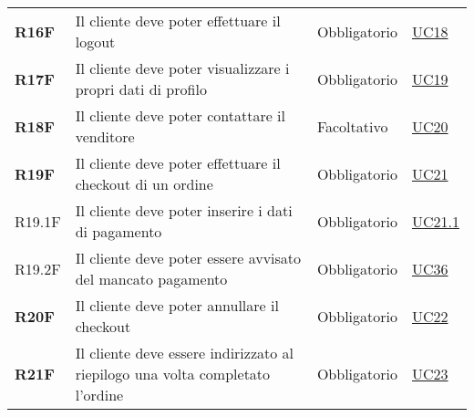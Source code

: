 \begin{center}
\begin{longtable}[!h]{p{50px} p{245px} p{75px} p{50px}}
        \textbf{R16F}                         & Il cliente deve poter effettuare il logout                                                          & Obbligatorio             & \hyperref[sec:UC18]{UC18}                      \\
        \textbf{R17F}                         & Il cliente deve poter visualizzare i propri dati di profilo                                         & Obbligatorio             & \hyperref[sec:UC19]{UC19}                      \\
        \textbf{R18F}                         & Il cliente deve poter contattare il venditore                                                       & Facoltativo              & \hyperref[sec:UC20]{UC20}                      \\
        \textbf{R19F}                         & Il cliente deve poter effettuare il checkout di un ordine                                           & Obbligatorio             & \hyperref[sec:UC21]{UC21}                      \\
        R19.1F                                & Il cliente deve poter inserire i dati di pagamento                                                  & Obbligatorio             & \hyperref[sec:UC21.1]{UC21.1}                  \\
        R19.2F                                & Il cliente deve poter essere avvisato del mancato pagamento                                         & Obbligatorio             & \hyperref[sec:UC36]{UC36}                      \\
        \textbf{R20F}                         & Il cliente deve poter annullare il checkout                                                         & Obbligatorio             & \hyperref[sec:UC22]{UC22}                      \\
        \textbf{R21F}                         & Il cliente deve essere indirizzato al riepilogo una volta completato l'ordine                       & Obbligatorio             & \hyperref[sec:UC23]{UC23}                      \\

\end{longtable}
\end{center}
